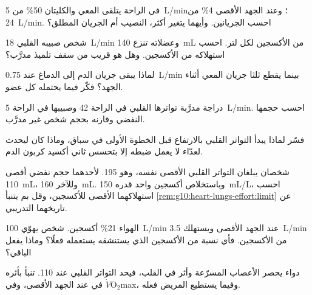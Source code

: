 \begin{exercise}[$\star\star$]\label{exo:g10:heart-lungs-effort:7}
في الراحة يتلقى المعي والكليتان 50\% من \qty{5}{L/min}؛ وعند الجهد
الأقصى 4\% من \qty{24}{L/min}. احسب الجريانين. وأيهما يتغير أكثر،
النصيب أم الجريان المطلق؟
\end{exercise}

\begin{exercise}[$\star\star$]\label{exo:g10:heart-lungs-effort:8}
شخص صبيبه القلبي \qty{18}{L/min} وعضلاته تنزع \qty{140}{mL} من
الأكسجين لكل لتر. احسب استهلاكه من الأكسجين. وهل هو قريب من سقف تلميذ
مدرَّب؟
\end{exercise}

\begin{exercise}[$\star\star$]\label{exo:g10:heart-lungs-effort:9}
لماذا يبقى جريان الدم إلى الدماغ عند \qty{0.75}{L/min} بينما يقطع
ثلثا جريان المعي أثناء الجهد؟ فكّر فيما يحتمله كل عضو.
\end{exercise}

\begin{exercise}[$\star\star$]\label{exo:g10:heart-lungs-effort:10}
دراجة مدرَّبة تواترها القلبي في الراحة 42 وصبيبها في الراحة
\qty{5}{L/min}. احسب حجمها النفضي وقارنه بحجم شخص غير مدرَّب.
\end{exercise}

\begin{exercise}[$\star\star$]\label{exo:g10:heart-lungs-effort:11}
فسّر لماذا يبدأ التواتر القلبي بالارتفاع قبل الخطوة الأولى في سباق،
وماذا كان ليحدث لعدّاء لا يعمل ضبطه إلا بتحسس ثاني أكسيد كربون الدم.
\end{exercise}

\begin{exercise}[$\star\star\star$]\label{exo:g10:heart-lungs-effort:12}
شخصان يبلغان التواتر القلبي الأقصى نفسه، وهو 195. لأحدهما حجم نفضي
أقصى \qty{110}{mL}، وللآخر \qty{160}{mL}. وباستخلاص أكسجين واحد قدره
\qty{150}{mL/L}، احسب استهلاكهما الأقصى للأكسجين، وقل بم يتنبأ
\cref{rem:g10:heart-lungs-effort:limit} عن تاريخهما التدريبي.
\end{exercise}

\begin{exercise}[$\star\star\star$]\label{exo:g10:heart-lungs-effort:13}
الهواء 21\% أكسجين. شخص يهوّي \qty{100}{L/min} عند الجهد الأقصى
ويستهلك \qty{3.5}{L/min} من الأكسجين. فأي نسبة من الأكسجين الذي
يستنشقه يستعمله فعلًا؟ وماذا يفعل الباقي؟
\end{exercise}

\begin{exercise}[$\star\star\star$]\label{exo:g10:heart-lungs-effort:14}
دواء يحصر الأعصاب المسرّعة وأثر  في القلب، فيحد التواتر
القلبي عند 110. تنبأ بأثره في  عند الجهد الأقصى، وفي
$\dot V\!\mathrm{O_2}$max، وفيما يستطيع المريض فعله.
\end{exercise}

